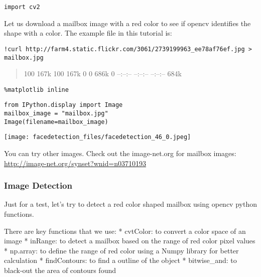 \begin{lstlisting}
import cv2
\end{lstlisting}

Let us download a mailbox image with a red color to see if opencv
identifies the shape with a color. The example file in this tutorial is:

\begin{lstlisting}
!curl http://farm4.static.flickr.com/3061/2739199963_ee78af76ef.jpg > mailbox.jpg
\end{lstlisting}

\begin{quote}
100 167k 100 167k 0 0 686k 0 --:--:-- --:--:-- --:--:-- 684k
\end{quote}

\begin{lstlisting}
%matplotlib inline
\end{lstlisting}

\begin{lstlisting}
from IPython.display import Image
mailbox_image = "mailbox.jpg"
Image(filename=mailbox_image)
\end{lstlisting}

\texttt{[image: facedetection\_files/facedetection\_46\_0.jpeg]}

You can try other images. Check out the image-net.org for mailbox
images: \url{http://image-net.org/synset?wnid=n03710193}

\subsubsection{Image Detection}\label{image-detection}

Just for a test, let's try to detect a red color shaped mailbox using
opencv python functions.

There are key functions that we use: * cvtColor: to convert a color
space of an image * inRange: to detect a mailbox based on the range of
red color pixel values * np.array: to define the range of red color
using a Numpy library for better calculation * findContours: to find a
outline of the object * bitwise\_and: to black-out the area of contours
found

